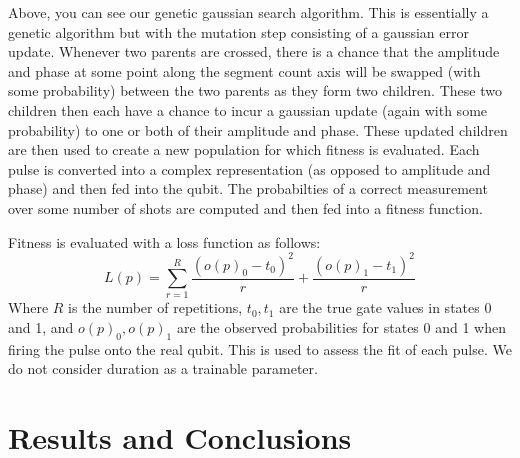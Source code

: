 \documentclass{article}
\begin{document}
Above, you can see our genetic gaussian search algorithm. This is essentially a genetic algorithm
but with the mutation step consisting of a gaussian error update. Whenever two parents are crossed,
there is a chance that the amplitude and phase at some point along the segment count axis will be swapped
(with some probability)
between the two parents as they form two children. These two children then each have a chance to incur 
a gaussian update (again with some probability) to one or both of their amplitude and phase. These updated
children are then used to create a new population for which fitness is evaluated. Each pulse is
converted into a complex representation (as opposed to amplitude and phase) and then fed into the 
qubit. The probabilties of a correct measurement over some number of shots are computed and then fed into
a fitness function.

Fitness is evaluated with a loss function as follows:
$$L(p) = \sum_{r=1}^R \frac{(o(p)_0 - t_0)^2}{r} + \frac{(o(p)_1 - t_1)^2}{r}$$
Where $R$ is the number of repetitions, $t_0, t_1$ are the true gate values in states 0 and 1, and $o(p)_0, o(p)_1$
are the observed probabilities for states 0 and 1 when firing the pulse onto the real qubit. This is used 
to assess the fit of each pulse. We do not consider duration as a trainable parameter.


\section{Results and Conclusions}
\end{document}
